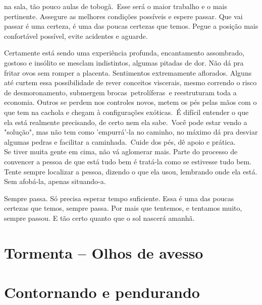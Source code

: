 na sala, tão pouco aulas de tobogã. Esse será o maior trabalho e o mais pertinente. Assegure as melhores condições possíveis e
espere passar. Que vai passar é uma certeza, é uma das poucas certezas que temos. Pegue a posição mais confortável possível,
evite acidentes e aguarde.\\
\par
\indent Certamente está sendo uma experiência profunda, encantamento assombrado, gostoso e insólito se mesclam indistintos,
algumas pitadas de dor. Não dá pra fritar ovos sem romper a placenta. Sentimentos extremamente aflorados. Alguns até curtem essa
possibilidade de rever conceitos viscerais, mesmo correndo o risco de desmoronamento, submergem brocas petrolíferas e
reestruturam toda a economia. Outros se perdem nos controles novos, metem os pés pelas mãos com o que tem na cachola e chegam à
configurações exóticas. É difícil entender o que ela está realmente precisando, de certo nem ela sabe. Você pode estar vendo a
"solução", mas não tem como 'empurrá'-la no caminho, no máximo dá pra desviar algumas pedras e facilitar a caminhada. Cuide dos
pés, dê apoio e prática.\\
\noindent Se tiver muita gente em cima, não vá aglomerar mais. Parte do processo de convencer a pessoa de que está tudo bem é
tratá-la como se estivesse tudo bem.
Tente sempre localizar a pessoa, dizendo o que ela usou, lembrando onde ela está. Sem afobá-la, apenas situando-a.\\
\par
\indent Sempre passa. Só precisa esperar tempo suficiente. Essa é uma das poucas certezas que temos, sempre passa. Por mais que
tentemos, e tentamos muito, sempre passou. E tão certo quanto que o sol nascerá amanhã.
\section*{Tormenta -- Olhos de avesso}
\section*{Contornando e pendurando}
%
%
%
%

%
%
%
